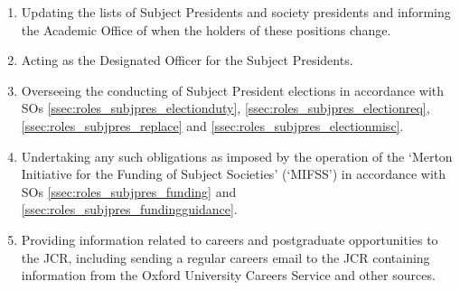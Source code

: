 \begin{enumerate}
	\item Updating the lists of Subject Presidents and society presidents and informing the Academic Office of when the holders of these positions change.
	\item Acting as the Designated Officer for the Subject Presidents.
	\item Overseeing the conducting of Subject President elections in accordance with SOs \ref{ssec:roles_subjpres_electionduty}, \ref{ssec:roles_subjpres_electionreq}, \ref{ssec:roles_subjpres_replace} and \ref{ssec:roles_subjpres_electionmisc}.
	\item Undertaking any such obligations as imposed by the operation of the `Merton Initiative for the Funding of Subject Societies' (`MIFSS') in accordance with SOs \ref{ssec:roles_subjpres_funding} and \ref{ssec:roles_subjpres_fundingguidance}.
	\item Providing information related to careers and postgraduate opportunities to the JCR, including sending a regular careers email to the JCR containing information from the Oxford University Careers Service and other sources.
\end{enumerate}
